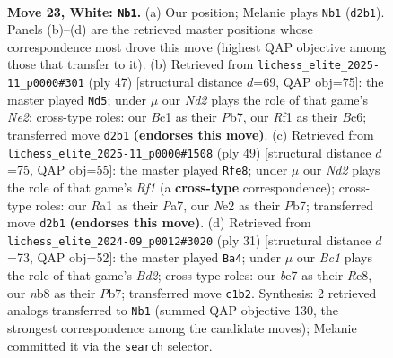 \documentclass[11pt]{article}
\begin{document}
\clearpage

\begin{figure}[p]\centering
\begin{subfigure}{0.46\textwidth}\centering
\resizebox{\linewidth}{!}{%
\newchessgame
\chessboard[
  setfen={rn2kr2/pp2b1pp/4b3/3pPp1P/8/P5P1/3NN3/R1B2RK1 w - - 3 23},
  showmover=false,
  pgfstyle=straightmove, color=movearrow, markmove={d2-b1}
]}
\caption{}
\end{subfigure}\hfill
\begin{subfigure}{0.46\textwidth}\centering
\resizebox{\linewidth}{!}{%
\newchessgame
\chessboard[
  setfen={r2r2k1/pp2nppp/2b5/6P1/3P3P/2BB1P2/P4K2/2R4R b - - 4 24},
  showmover=false,
  pgfstyle=straightmove, color=movearrow, markmove={e7-d5}
]}
\caption{}
\end{subfigure}
\\[4pt]
\begin{subfigure}{0.46\textwidth}\centering
\resizebox{\linewidth}{!}{%
\newchessgame
\chessboard[
  setfen={3r1rk1/pp5p/2n2pp1/8/2bP4/P1P4P/2B2PPB/R2R2K1 b - - 1 25},
  showmover=false,
  pgfstyle=straightmove, color=movearrow, markmove={f8-e8}
]}
\caption{}
\end{subfigure}\hfill
\begin{subfigure}{0.46\textwidth}\centering
\resizebox{\linewidth}{!}{%
\newchessgame
\chessboard[
  setfen={r1r3k1/pp1b1pp1/5n1p/2Pp4/8/1NP1PP2/P5PP/3RKB1R b K - 2 16},
  showmover=false,
  pgfstyle=straightmove, color=movearrow, markmove={d7-a4}
]}
\caption{}
\end{subfigure}
\caption{\textbf{Move 23, White: \texttt{Nb1}.} (a) Our position; Melanie plays \texttt{Nb1} (\texttt{d2b1}). Panels (b)--(d) are the retrieved master positions whose correspondence most drove this move (highest QAP objective among those that transfer to it). (b) Retrieved from \texttt{lichess\_elite\_2025-11\_p0000\#301} (ply 47) [structural distance $d$=69, QAP obj=75]: the master played \texttt{Nd5}; under $\mu$ our \emph{Nd2} plays the role of that game's \emph{Ne2}; cross-type roles: our \emph{B}c1 as their \emph{P}b7, our \emph{R}f1 as their \emph{B}c6; transferred move \texttt{d2b1} \textbf{(endorses this move)}. (c) Retrieved from \texttt{lichess\_elite\_2025-11\_p0000\#1508} (ply 49) [structural distance $d$=75, QAP obj=55]: the master played \texttt{Rfe8}; under $\mu$ our \emph{Nd2} plays the role of that game's \emph{Rf1} (a \textbf{cross-type} correspondence); cross-type roles: our \emph{R}a1 as their \emph{P}a7, our \emph{N}e2 as their \emph{P}b7; transferred move \texttt{d2b1} \textbf{(endorses this move)}. (d) Retrieved from \texttt{lichess\_elite\_2024-09\_p0012\#3020} (ply 31) [structural distance $d$=73, QAP obj=52]: the master played \texttt{Ba4}; under $\mu$ our \emph{Bc1} plays the role of that game's \emph{Bd2}; cross-type roles: our \emph{b}e7 as their \emph{R}c8, our \emph{n}b8 as their \emph{P}b7; transferred move \texttt{c1b2}. Synthesis: 2 retrieved analogs transferred to \texttt{Nb1} (summed QAP objective 130, the strongest correspondence among the candidate moves); Melanie committed it via the \texttt{search} selector.}
\label{fig:thought-m44}
\end{figure}
\end{document}
